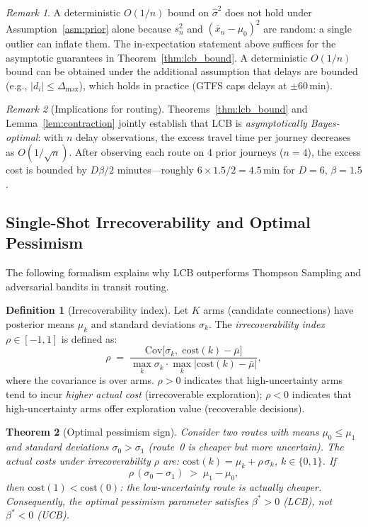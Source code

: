 \documentclass[11pt]{article}
\newtheorem{theorem}{Theorem}
\theoremstyle{definition}
\newtheorem{definition}[theorem]{Definition}
\theoremstyle{remark}
\newtheorem{remark}{Remark}
\begin{document}
\begin{remark}
A deterministic $O(1/n)$ bound on $\hat\sigma^2$ does not hold under
Assumption~\ref{asm:prior} alone because $s_n^2$ and $(\bar{x}_n-\mu_0)^2$
are random: a single outlier can inflate them. The in-expectation
statement above suffices for the asymptotic guarantees in
Theorem~\ref{thm:lcb_bound}. A deterministic $O(1/n)$ bound can be
obtained under the additional assumption that delays are bounded
(e.g., $|d_i|\leq \Delta_{\max}$), which holds in practice (GTFS
caps delays at $\pm 60$\,min).
\end{remark}

\begin{remark}[Implications for routing]
Theorems~\ref{thm:lcb_bound} and Lemma~\ref{lem:contraction} jointly establish
that LCB is \emph{asymptotically Bayes-optimal}: with $n$ delay observations,
the excess travel time per journey decreases as $O(1/\sqrt{n})$.
After observing each route on 4 prior journeys ($n = 4$),
the excess cost is bounded by $D\beta/2$ minutes---roughly
$6 \times 1.5 / 2 = 4.5$\,min for $D=6$, $\beta=1.5$.
\end{remark}

\subsection{Single-Shot Irrecoverability and Optimal Pessimism}

The following formalism explains why LCB outperforms Thompson Sampling
and adversarial bandits in transit routing.

\begin{definition}[Irrecoverability index]\label{def:rho}
Let $K$ arms (candidate connections) have posterior means $\mu_k$
and standard deviations $\sigma_k$.
The \emph{irrecoverability index} $\rho \in [-1, 1]$ is defined as:
\[
\rho \;=\; \frac{\mathrm{Cov}\bigl[\sigma_k,\;\mathrm{cost}(k) - \bar\mu\bigr]}
               {\max_k \sigma_k \cdot \max_k |\mathrm{cost}(k) - \bar\mu|},
\]
where the covariance is over arms.
$\rho > 0$ indicates that high-uncertainty arms tend to incur
\emph{higher actual cost} (irrecoverable exploration);
$\rho < 0$ indicates that high-uncertainty arms offer
exploration value (recoverable decisions).
\end{definition}

\begin{theorem}[Optimal pessimism sign]\label{thm:rho}
Consider two routes with means $\mu_0 \leq \mu_1$ and standard deviations
$\sigma_0 > \sigma_1$ (route~0 is cheaper but more uncertain).
The actual costs under irrecoverability $\rho$ are:
$\mathrm{cost}(k) = \mu_k + \rho\,\sigma_k$, $k \in \{0,1\}$.
If
\[
\rho\,(\sigma_0 - \sigma_1) \;>\; \mu_1 - \mu_0,
\]
then $\mathrm{cost}(1) < \mathrm{cost}(0)$:
\emph{the low-uncertainty route is actually cheaper}.
Consequently, the optimal pessimism parameter satisfies $\beta^* > 0$ (LCB),
not $\beta^* < 0$ (UCB).
\end{theorem}
\end{document}
